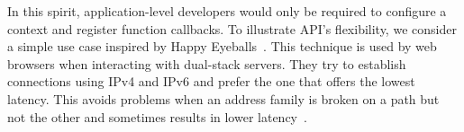 In this spirit, application-level developers would only be required to
configure a \tcpls context and register function callbacks.
To illustrate \tcpls API's flexibility, we consider a simple
use case inspired by Happy Eyeballs~\cite{rfc8305}. This technique is
used by web browsers when interacting with dual-stack servers. They
try to establish \tcp connections using IPv4 and IPv6 and prefer the
one that offers the lowest latency. This avoids problems when an address
family is broken on a path but not the other and sometimes results in
lower latency~\cite{bajpai2019longitudinal}.


